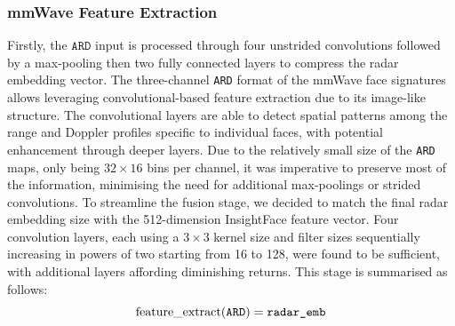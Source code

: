 \documentclass{mpaper}
\begin{document}

\subsubsection{mmWave Feature Extraction}
Firstly, the $\mathtt{ARD}$ input is processed through four unstrided convolutions followed by a max-pooling then two fully connected layers to compress the radar embedding vector. The three-channel \texttt{ARD} format of the mmWave face signatures allows leveraging convolutional-based feature extraction due to its image-like structure. The convolutional layers are able to detect spatial patterns among the range and Doppler profiles specific to individual faces, with potential enhancement through deeper layers. Due to the relatively small size of the \texttt{ARD} maps, only being $32 \times 16$ bins per channel, it was imperative to preserve most of the information, minimising the need for additional max-poolings or strided convolutions. To streamline the fusion stage, we decided to match the final radar embedding size with the 512-dimension InsightFace feature vector. Four convolution layers, each using a $3 \times 3$ kernel size and filter sizes sequentially increasing in powers of two starting from 16 to 128, were found to be sufficient, with additional layers affording diminishing returns. This stage is summarised as follows:
$$\text{feature\_extract}(\mathtt{ARD}) = \verb|radar_emb|$$
\end{document}
